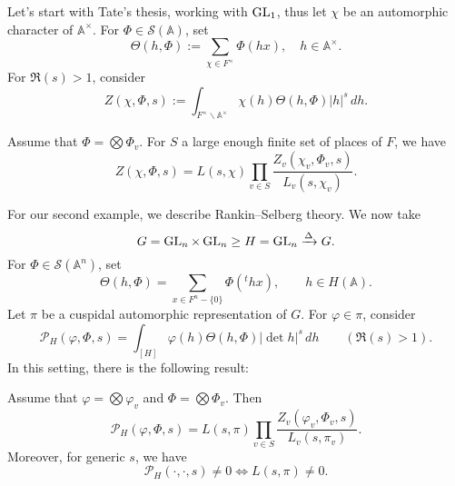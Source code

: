 \documentclass[reqno]{amsart} 
\begin{document}
Let's start with Tate's thesis, working with $\operatorname{GL}_1$, thus let $\chi$ be an automorphic character of $\mathbb{A}^\times$.  For $\Phi \in \mathcal{S}(\mathbb{A})$, set
\begin{equation*}
  \Theta(h, \Phi):= \sum_{\chi \in F^\times} \Phi(h x), \quad h \in \mathbb{A}^\times.
\end{equation*}
For $\Re(s) > 1$, consider
\begin{equation*}
  Z(\chi, \Phi, s) := \int_{F^\times \backslash \mathbb{A}^\times}
  \chi(h) \Theta(h, \Phi) \lvert h \rvert^s \, d h.
\end{equation*}
\begin{theorem}[Tate]
  Assume that $\Phi = \bigotimes \Phi_v$.  For $S$ a large enough finite set of places of $F$, we have
  \begin{equation*}
    Z(\chi, \Phi, s) = L(s, \chi) \prod_{v \in S}
    \frac{Z_v(\chi_v, \Phi_v, s)}{ L_v(s, \chi_v)}.
  \end{equation*}
\end{theorem}

For our second example, we describe Rankin--Selberg theory.  We now take
\begin{equation*}
  G = \operatorname{GL}_n \times \operatorname{GL}_n \geq H = \operatorname{GL}_n \xrightarrow{\Delta} G.
\end{equation*}  For $\Phi \in \mathcal{S}(\mathbb{A}^n)$, set
\begin{equation*}
  \Theta(h, \Phi) = \sum_{x \in F^n - \{0\}} \Phi({}^t h x), \qquad h \in H(\mathbb{A}).
\end{equation*}
Let $\pi$ be a cuspidal automorphic representation of $G$.  For $\varphi \in \pi$, consider
\begin{equation*}
  \mathcal{P}_H(\varphi, \Phi, s)
  = \int_{[H]}
  \varphi(h) \Theta(h, \Phi) \lvert \det h \rvert^s \, d h \qquad (\Re(s) > 1).
\end{equation*}
In this setting, there is the following result:
\begin{theorem}
  Assume that $\varphi = \bigotimes \varphi_v$ and $\Phi = \bigotimes \Phi_v$.  Then
  \begin{equation*}
    \mathcal{P}_H(\varphi, \Phi, s) = L(s, \pi)\prod_{v \in S}
    \frac{Z_v(\varphi_v, \Phi_v, s)}{ L_v(s, \pi_v)}.
  \end{equation*}
  Moreover, for generic $s$, we have
  \begin{equation*}
    \mathcal{P}_H(\cdot, \cdot, s) \neq 0 \iff L(s, \pi) \neq 0.
  \end{equation*}
\end{theorem}
\end{document}
